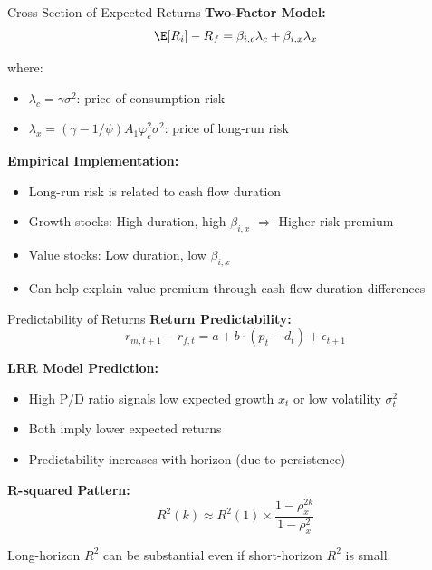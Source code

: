 \documentclass{beamer}
\begin{document}
\begin{frame}{Cross-Section of Expected Returns}
    \textbf{Two-Factor Model:}
    \begin{equation}
        \E[R_i] - R_f = \beta_{i,c} \lambda_c + \beta_{i,x} \lambda_x
    \end{equation}
    
    where:
    \begin{itemize}
        \item $\lambda_c = \gamma \sigma^2$: price of consumption risk
        \item $\lambda_x = (\gamma - 1/\psi) A_1 \varphi_e^2 \sigma^2$: price of long-run risk
    \end{itemize}
    
    \vspace{0.3cm}
    \textbf{Empirical Implementation:}
    \begin{itemize}
        \item Long-run risk is related to cash flow duration
        \item Growth stocks: High duration, high $\beta_{i,x}$ $\Rightarrow$ Higher risk premium
        \item Value stocks: Low duration, low $\beta_{i,x}$
        \item Can help explain value premium through cash flow duration differences
    \end{itemize}
\end{frame}

\begin{frame}{Predictability of Returns}
    \textbf{Return Predictability:}
    \begin{equation}
        r_{m,t+1} - r_{f,t} = a + b \cdot (p_t - d_t) + \epsilon_{t+1}
    \end{equation}
    
    \textbf{LRR Model Prediction:}
    \begin{itemize}
        \item High P/D ratio signals low expected growth $x_t$ or low volatility $\sigma_t^2$
        \item Both imply lower expected returns
        \item Predictability increases with horizon (due to persistence)
    \end{itemize}
    
    \vspace{0.3cm}
    \textbf{R-squared Pattern:}
    \begin{equation}
        R^2(k) \approx R^2(1) \times \frac{1 - \rho_x^{2k}}{1 - \rho_x^2}
    \end{equation}
    
    Long-horizon $R^2$ can be substantial even if short-horizon $R^2$ is small.
\end{frame}
\end{document}
